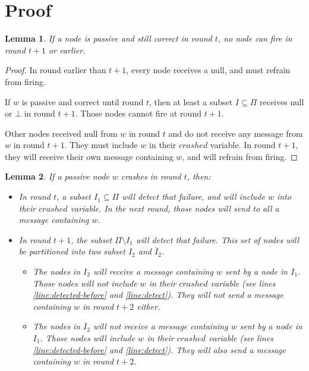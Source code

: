 \documentclass{article}
\newtheorem{lemma}{Lemma}
\begin{document}
\section{Proof}

\begin{lemma} \label{lem:passiv-wait}
	If a node is passive and still correct in round $t$, no node can fire in round $t+1$ or earlier.
\end{lemma}
\begin{proof}
	In round earlier than $t+1$, every node receives a null, and must refrain from firing.

	If $w$ is passive and correct until round $t$, then at least a subset $I \subseteq \Pi$ receives null or $\bot$ in round $t+1$.
	Those nodes cannot fire at round $t+1$.

	Other nodes received null from $w$ in round $t$ and do not receive any message from $w$ in round $t+1$.
	They must include $w$ in their $crashed$ variable. In round $t+1$, they will receive their own message containing $w$, and will refrain from firing.
\end{proof}

\begin{lemma} \label{lem:split}
	If a passive node $w$ crashes in round $t$, then:
	\begin{itemize}
		\item In round $t$, a subset $I_1 \subseteq \Pi$ will detect that failure, and will include $w$ into their $crashed$ variable.
			In the next round, those nodes will send to all a message containing $w$.
		\item In round $t+1$, the subset $\Pi \setminus I_1$ will detect that failure. This set of nodes will be partitioned into two subset $I_2$ and $\overline{I}_2$.
		\begin{itemize}
			\item The nodes in $I_2$ will receive a message containing $w$ sent by a node in $I_1$. Those nodes will not include $w$ in their $crashed$ variable
				(see lines \ref{line:detected-before} and \ref{line:detect}).
				They will not send a message containing $w$ in round $t+2$ either.
			\item The nodes in $\overline{I}_2$ will not receive a message containing $w$ sent by a node in $I_1$. Those nodes will include $w$ in their $crashed$ variable
				(see lines \ref{line:detected-before} and \ref{line:detect}).
				They will also send a message containing $w$ in round $t+2$.
		\end{itemize}
	\end{itemize}
\end{lemma}
\end{document}
